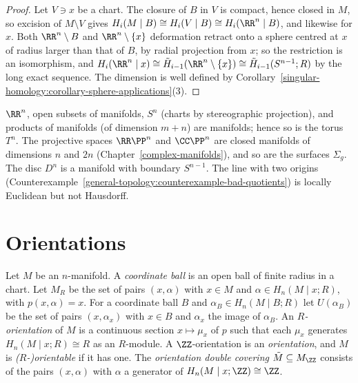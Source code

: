 \begin{proof}
Let $V \ni x$ be a chart. The closure of $B$ in $V$ is compact, hence closed in $M$, so excision of $M \setminus V$ gives
$H_i(M \mid B) \cong H_i(V \mid B) \cong H_i(\RR^n \mid B)$, and likewise for $x$. Both $\RR^n \setminus B$ and $\RR^n \setminus \{x\}$ deformation retract onto a sphere
centred at $x$ of radius larger than that of $B$, by radial projection from $x$; so the restriction is an isomorphism, and
$H_i(\RR^n \mid x) \cong \tilde{H}_{i-1}(\RR^n \setminus \{x\}) \cong \tilde{H}_{i-1}(S^{n-1}; R)$ by the long exact sequence. The dimension is well defined by
Corollary~\ref{singular-homology:corollary-sphere-applications}(3).
\end{proof}

\begin{example}\label{poincare-duality:example-manifolds}
$\RR^n$, open subsets of manifolds, $S^n$ (charts by stereographic projection), and products of manifolds (of dimension $m + n$) are manifolds; hence so is the
torus $T^n$. The projective spaces $\RR\PP^n$ and $\CC\PP^n$ are closed manifolds of dimensions $n$ and $2n$ (Chapter~\ref{complex-manifolds}), and so are the
surfaces $\Sigma_g$. The disc $D^n$ is a manifold with boundary $S^{n-1}$. The line with two origins
(Counterexample~\ref{general-topology:counterexample-bad-quotients}) is locally Euclidean but not Hausdorff.
\end{example}

\section{Orientations}\label{poincare-duality:section-orientations}

\begin{definition}\label{poincare-duality:definition-orientation-covering}
Let $M$ be an $n$-manifold. A \emph{coordinate ball} is an open ball of finite radius in a chart. Let $M_R$ be the set of pairs $(x, \alpha)$ with $x \in M$ and
$\alpha \in H_n(M \mid x; R)$, with $p(x, \alpha) = x$. For a coordinate ball $B$ and $\alpha_B \in H_n(M \mid B; R)$ let $U(\alpha_B)$ be the set of pairs
$(x, \alpha_x)$ with $x \in B$ and $\alpha_x$ the image of $\alpha_B$. An \emph{$R$-orientation} of $M$ is a continuous section $x \mapsto \mu_x$ of $p$ such that
each $\mu_x$ generates $H_n(M \mid x; R) \cong R$ as an $R$-module. A $\ZZ$-orientation is an \emph{orientation}, and $M$ is \emph{($R$-)orientable} if it has one.
The \emph{orientation double covering} $\tilde{M} \subseteq M_\ZZ$ consists of the pairs $(x, \alpha)$ with $\alpha$ a generator of $H_n(M \mid x; \ZZ) \cong \ZZ$.
\end{definition}

